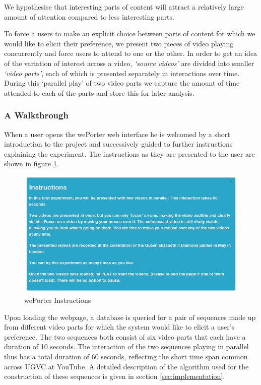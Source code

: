 We hypothesise that interesting parts of content will attract a relatively large amount of attention compared to less interesting parts. 

To force a users to make an explicit choice between parts of content for which we would like to elicit their preference, we present two pieces of video playing concurrently and force users to attend to one or the other. In order to get an idea of the variation of interest across a video, \emph{`source videos'} are divided into smaller \emph{`video parts'}, each of which is presented separately in interactions over time. During this `parallel play' of two video parts we capture the amount of time attended to each of the parts and store this for later analysis. 

\subsubsection{A Walkthrough}
When a user opens the wePorter web interface he is welcomed by a short introduction to the project and successively guided to further instructions explaining the experiment. The instructions as they are presented to the user are shown in figure \ref{fig:instructions}.

\begin{figure}[htbp]
  \centering
    \includegraphics[width=\textwidth]{img/instructions}
  \caption{wePorter Instructions}
  \label{fig:instructions}
\end{figure}

Upon loading the webpage, a database is queried for a pair of sequences made up from different video parts for which the system would like to elicit a user's preference. The two sequences both consist of six video parts that each have a duration of 10 seconds. The interaction of the two sequences playing in parallel thus has a total duration of 60 seconds, reflecting the short time span common across UGVC at YouTube\cite{Cha:2007ty, Cheng:2007tc}. A detailed description of the algorithm used for the construction of these sequences is given in section \ref{sec:implementation}.

